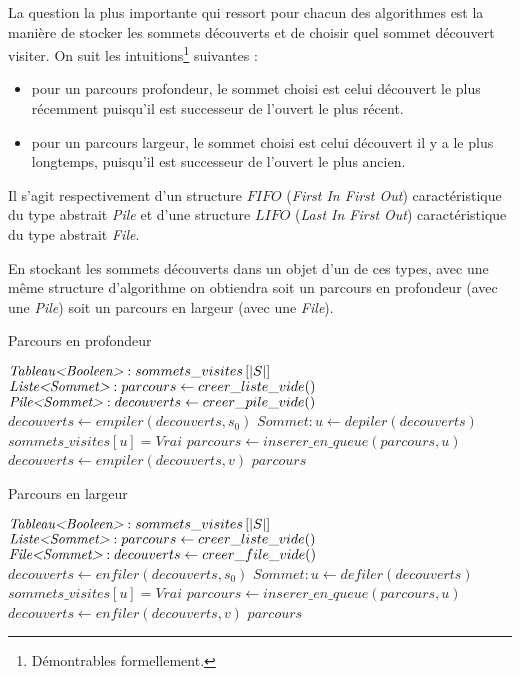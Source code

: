 \documentclass[../../../main.tex]{subfiles}
\begin{document}
La question la plus importante qui ressort pour chacun des algorithmes est la manière de stocker les sommets découverts et de choisir quel sommet découvert visiter. On suit les intuitions\footnote{Démontrables formellement.} suivantes :
\begin{itemize}
	\item pour un parcours profondeur, le sommet choisi est celui découvert le plus récemment puisqu'il est successeur de l'ouvert le plus récent.
	\item pour un parcours largeur, le sommet choisi est celui découvert il y a le plus longtemps, puisqu'il est successeur de l'ouvert le plus ancien.
\end{itemize}
Il s'agit respectivement d'un structure $FIFO$ (\textit{First In First Out}) caractéristique du type abstrait \textit{Pile} et d'une structure $LIFO$ (\textit{Last In First Out}) caractéristique du type abstrait \textit{File}.

En stockant les sommets découverts dans un objet d'un de ces types, avec une même structure d'algorithme on obtiendra soit un parcours en profondeur (avec une \textit{Pile}) soit un parcours en largeur (avec une \textit{File}).

\begin{algorithm}
\caption{Parcours en profondeur}\label{alg:graph_dfs}
$\textit{Tableau\textless Booleen\textgreater }:sommets\_visites\left[|S|\right]$\;
$\textit{Liste\textless Sommet\textgreater }:parcours \leftarrow creer\_liste\_vide()$\;
$\textit{Pile\textless Sommet\textgreater }:decouverts\leftarrow creer\_pile\_vide()$\;
$decouverts \leftarrow empiler(decouverts, s_0)$\;
 {
	$Sommet:u\leftarrow depiler(decouverts)$\;
	 {
		$sommets\_visites[u] = \textit{Vrai}$\;
		$parcours\leftarrow inserer\_en\_queue(parcours, u)$\;
		 {
			$decouverts\leftarrow empiler(decouverts, v)$\;
		}
	}
}
\Return $parcours$\;
\end{algorithm}
\begin{algorithm}
\caption{Parcours en largeur}\label{alg:graph_bfs}
$\textit{Tableau\textless Booleen\textgreater }:sommets\_visites\left[|S|\right]$\;
$\textit{Liste\textless Sommet\textgreater }:parcours \leftarrow creer\_liste\_vide()$\;
$\textit{File\textless Sommet\textgreater }:decouverts\leftarrow creer\_file\_vide()$\;
$decouverts \leftarrow enfiler(decouverts, s_0)$\;
 {
	$Sommet:u\leftarrow defiler(decouverts)$\;
	 {
		$sommets\_visites[u] = \textit{Vrai}$\;
		$parcours\leftarrow inserer\_en\_queue(parcours, u)$\;
		 {
			$decouverts\leftarrow enfiler(decouverts, v)$\;
		}
	}
}
\Return $parcours$\;
\end{algorithm}
\end{document}
